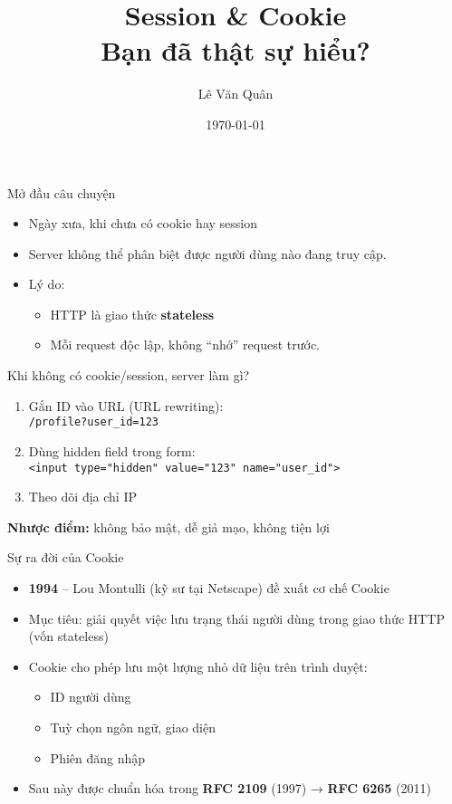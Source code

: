 \documentclass[aspectratio=169]{beamer}
\title{Session \& Cookie\\Bạn đã thật sự hiểu?}
\author{Lê Văn Quân}
\date{\today}
\begin{document}
\begin{frame}
  \titlepage
\end{frame}

\begin{frame}{Mở đầu câu chuyện}
  \begin{itemize}
    \item Ngày xưa, khi chưa có cookie hay session
    \item Server không thể phân biệt được người dùng nào đang truy cập.
    \item Lý do:
    \begin{itemize}
        \item HTTP là giao thức \textbf{stateless}
        \item Mỗi request độc lập, không ``nhớ'' request trước.
    \end{itemize}
  \end{itemize}
\end{frame}

\begin{frame}{Khi không có cookie/session, server làm gì?}
  \begin{enumerate}
    \item Gắn ID vào URL (URL rewriting):\\
    \texttt{/profile?user\_id=123}
    \item Dùng hidden field trong form:\\
    \texttt{<input type="hidden" value="123" name="user\_id">}
    \item Theo dõi địa chỉ IP
  \end{enumerate}
  \vspace{1em}
  \textbf{Nhược điểm:} không bảo mật, dễ giả mạo, không tiện lợi
\end{frame}

\begin{frame}{Sự ra đời của Cookie}
  \begin{itemize}
    \item \textbf{1994} – Lou Montulli (kỹ sư tại Netscape) đề xuất cơ chế Cookie
    \item Mục tiêu: giải quyết việc lưu trạng thái người dùng trong giao thức HTTP (vốn stateless)
    \item Cookie cho phép lưu một lượng nhỏ dữ liệu trên trình duyệt:
    \begin{itemize}
      \item ID người dùng
      \item Tuỳ chọn ngôn ngữ, giao diện
      \item Phiên đăng nhập
    \end{itemize}
    \item Sau này được chuẩn hóa trong \textbf{RFC 2109} (1997) → \textbf{RFC 6265} (2011)
  \end{itemize}
\end{frame}
\end{document}
